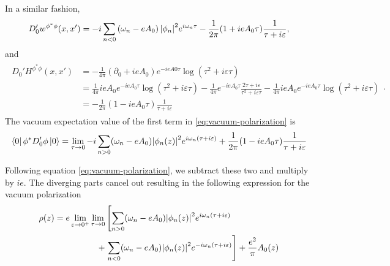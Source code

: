 In a similar fashion, 
\begin{align}
	D_0'w^{\phi^* \phi}(x, x') = -i \sum_{n<0}^{} \left( \omega_n  -eA_0 \right) \abs{\phi_n}^2 e^{i\omega_n \tau}-\frac{1}{2\pi}(1+ieA_0\tau) \frac{1}{\tau + i\varepsilon},
\end{align}
and 
\begin{align}
	\begin{split}
			D_0'H^{\phi^* \phi}(x, x')&= -\frac{1}{4\pi} (\partial_0+ ieA_0)e^{-ieA0\tau} \log\left( \tau^2 + i\varepsilon \tau \right) \\
			&= \frac{1}{4\pi} ieA_0 e^{-ieA_0 \tau} \log(\tau^2+i\varepsilon \tau) 
		-\frac{1}{4\pi} e^{-ieA_0 \tau} \frac{2\tau +i \varepsilon }{\tau^2+i\varepsilon\tau} - \frac{1}{4\pi} ieA_0e^{-ieA_0\tau} \log(\tau^2+i\varepsilon \tau)\\
		&= -\frac{1}{2\pi}(1-ieA_0\tau) \frac{1}{\tau + i\varepsilon} 
	\end{split}.
\end{align}
The vacuum expectation value of the first term in \eqref{eq:vacuum-polarization} is 
\begin{align}
	\bra{0}\phi^* D_0'\phi\ket{0} = \lim_{\tau \to 0} -i\sum_{n>0}^{} (\omega_n - eA_0)\abs{\phi_n(z)}^2 e^{i\omega_n (\tau+ i \varepsilon)} + \frac{1}{2\pi}(1-ieA_0\tau) \frac{1}{\tau + i\varepsilon} 
\end{align}

Following equation \eqref{eq:vacuum-polarization}, we subtract these two and multiply by $ie$. The diverging parts cancel out resulting in the following expression for the vacuum polarization
\begin{align}
	\begin{split}
		\rho(z)	 = e\lim_{\varepsilon \to 0^+} \lim_{\tau \to 0}  &\left[  \sum_{n>0}^{} (\omega_n - eA_0)\abs{\phi_n(z)}^2 e^{i\omega_n (\tau+ i \varepsilon)} \right. \\
			   +& \left.  \sum_{n<0}^{} (\omega_n - eA_0)\abs{\phi_n(z)}^2 e^{-i\omega_n (\tau+ i \varepsilon)} \right]  + \frac{e^2}{\pi}A_0(z)\\
	\end{split}
\end{align}
